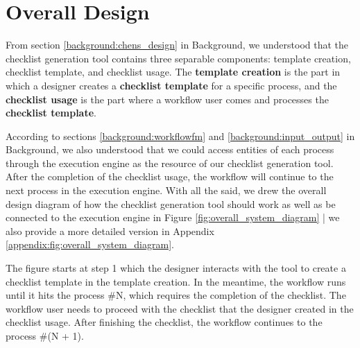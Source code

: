 


\section{Overall Design}
\label{design:overall}

From section \ref{background:chens_design} in Background, we understood that the checklist generation tool contains three separable components: template creation, checklist template, and checklist usage. The \textbf{template creation} is the part in which a designer creates a \textbf{checklist template} for a specific process, and the \textbf{checklist usage} is the part where a workflow user comes and processes the \textbf{checklist template}.

According to sections \ref{background:workflowfm} and \ref{background:input_output} in Background, we also understood that we could access entities of each process through the execution engine as the resource of our checklist generation tool. After the completion of the checklist usage, the workflow will continue to the next process in the execution engine. With all the said, we drew the overall design diagram of how the checklist generation tool should work as well as be connected to the execution engine in Figure \ref{fig:overall_system_diagram} | we also provide a more detailed version in Appendix \ref{appendix:fig:overall_system_diagram}.

The figure starts at step 1 which the designer interacts with the tool to create a checklist template in the template creation. In the meantime, the workflow runs until it hits the process \#N, which requires the completion of the checklist. The workflow user needs to proceed with the checklist that the designer created in the checklist usage. After finishing the checklist, the workflow continues to the process \#(N + 1).


